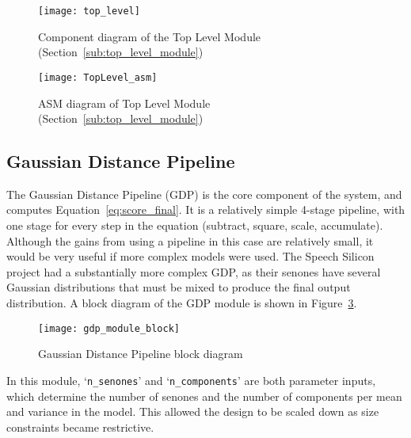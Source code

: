		\begin{figure}[tb]
			\begin{center}
				\texttt{[image: top\_level]}
			\end{center}
			\caption{Component diagram of the Top Level Module (Section~\ref{sub:top_level_module})}
			\label{fig:toplevel}
		\end{figure}

		\begin{figure}[tb]
			\begin{center}
				\texttt{[image: TopLevel\_asm]}
			\end{center}
			\caption{ASM diagram of Top Level Module (Section~\ref{sub:top_level_module})}
			\label{fig:topstatemachine}
		\end{figure}

	\subsection{Gaussian Distance Pipeline} %
	\label{sub:gaussian_distance_pipeline}
		The Gaussian Distance Pipeline (GDP) is the core component of the system, and computes Equation~\ref{eq:score_final}.  It is a relatively simple 4-stage pipeline, with one stage for every step in the equation (subtract, square, scale, accumulate).  Although the gains from using a pipeline in this case are relatively small, it would be very useful if more complex models were used.  The Speech Silicon \cite{schuster2006speech} project had a substantially more complex GDP, as their senones have several Gaussian distributions that must be mixed to produce the final output distribution.  A block diagram of the GDP module is shown in Figure~\ref{fig:gdp_block}.  %

		\begin{figure}[tb]
			\begin{center}
				\texttt{[image: gdp\_module\_block]}
			\end{center}
			\caption{Gaussian Distance Pipeline block diagram}
			\label{fig:gdp_block}
		\end{figure}

		In this module, `\texttt{n\_senones}' and `\texttt{n\_components}' are both parameter inputs, which determine the number of senones and the number of components per mean and variance in the model.  This allowed the design to be scaled down as size constraints became restrictive.

